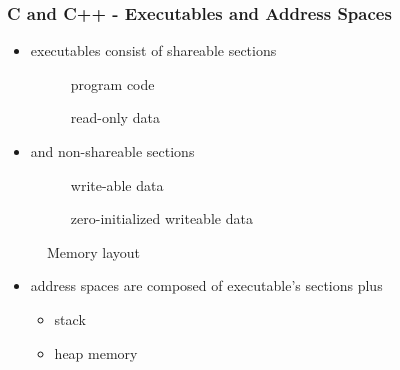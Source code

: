 \begin{frame}
 \frametitle{C and C++ - Executables and Address Spaces}
 \begin{itemize}
  \item executables consist of shareable sections
   \begin{description}
    \item[] program code
    \item[] read-only data
   \end{description}
  \item and non-shareable sections
   \begin{description}
    \item[] write-able data
    \item[] zero-initialized writeable data
   \end{description}
 \end{itemize}

 \begin{figure}
  \caption{Memory layout}
 \end{figure}

 \begin{itemize}
  \item address spaces are composed of executable's sections plus
   \begin{itemize}
    \item stack
    \item heap memory
   \end{itemize}
 \end{itemize}
\end{frame}


